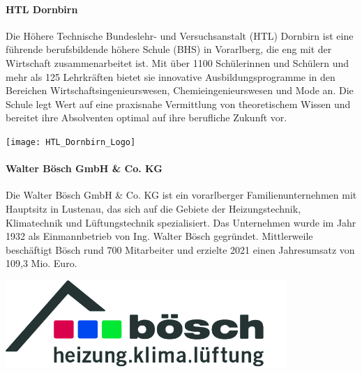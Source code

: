 \paragraph{HTL Dornbirn}
\vspace{1ex}
\begin{minipage}{0.6\textwidth}
    Die Höhere Technische Bundeslehr- und Versuchsanstalt (HTL) Dornbirn ist eine führende berufsbildende höhere Schule (BHS) in Vorarlberg, die eng mit der Wirtschaft zusammenarbeitet ist. Mit über 1100 Schülerinnen und Schülern und mehr als 125 Lehrkräften bietet sie innovative Ausbildungsprogramme in den Bereichen Wirtschaftsingenieurswesen, Chemieingenieurswesen und Mode an. Die Schule legt Wert auf eine praxisnahe Vermittlung von theoretischem Wissen und bereitet ihre Absolventen optimal auf ihre berufliche Zukunft vor.
\end{minipage}%
\hfill
\begin{minipage}{0.37\textwidth}
	\centering	
	\texttt{[image: HTL\_Dornbirn\_Logo]}
\end{minipage}
\vspace{1ex}

\paragraph{Walter Bösch GmbH \& Co. KG}
\vspace{1ex}
\begin{minipage}{0.6\textwidth}
Die Walter Bösch GmbH \& Co. KG ist ein vorarlberger Familienunternehmen mit Hauptsitz in Lustenau, das sich auf die Gebiete der Heizungstechnik, Klimatechnik und Lüftungstechnik spezialisiert. Das Unternehmen wurde im Jahr 1932 als Einmannbetrieb von Ing. Walter Bösch gegründet. Mittlerweile beschäftigt Bösch rund 700 Mitarbeiter und erzielte 2021 einen Jahresumsatz von 109,3 Mio. Euro. \cite[vgl.][]{walter_boesch:o.J.}
\end{minipage}%
\hfill
\begin{minipage}{0.37\textwidth}
	\centering	
	\includegraphics[width=0.8\textwidth]{boesch_logo_original}
\end{minipage}

